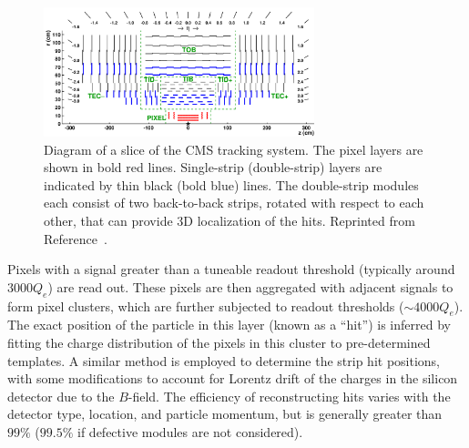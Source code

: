 \begin{figure}[]
    \begin{center} 
        \includegraphics[width=0.7\textwidth]{figures/cms/tracker.png}
        \caption{Diagram of a slice of the CMS tracking system.
                 The pixel layers are shown in bold red lines.
                 Single-strip (double-strip) layers are indicated by thin black (bold blue) lines.
                 The double-strip modules each consist of two back-to-back strips, rotated with respect to each other, that can provide 3D localization of the hits.
                 Reprinted from Reference~\cite{cmstracker}.}
        \label{fig:cms:si}
    \end{center}
\end{figure}

Pixels with a signal greater than a tuneable readout threshold (typically around $3000 Q_e$) are read out.
These pixels are then aggregated with adjacent signals to form pixel clusters, which are further subjected to readout thresholds ($\sim 4000 Q_e$).
The exact position of the particle in this layer (known as a ``hit'') is inferred by fitting the charge distribution of the pixels in this cluster to pre-determined templates.
A similar method is employed to determine the strip hit positions, with some modifications to account for Lorentz drift of the charges in the silicon detector due to the $B$-field. 
The efficiency of reconstructing hits varies with the detector type, location, and particle momentum, but is generally greater than $99\%$ ($99.5\%$ if defective modules are not considered). 

